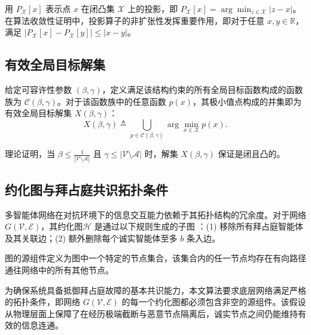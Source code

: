 \documentclass[12pt,hyperref,a4paper,UTF8]{ctexart}
\numberwithin{equation}{section}
\numberwithin{figure}{section}
\numberwithin{table}{section}
\begin{document}
用 $P_{\mathcal{X}}[x]$ 表示点 $x$ 在闭凸集 $\mathcal{X}$ 上的投影，即 $P_{\mathcal{X}}[x] = \arg\min_{z\in\mathcal{X}}|z-x|$。在算法收敛性证明中，投影算子的非扩张性发挥重要作用，即对于任意 $x,y\in\mathbb{R}$，满足 $|P_{\mathcal{X}}[x] - P_{\mathcal{X}}[y]| \le |x-y|$。

\subsection{有效全局目标解集}
\quad \quad 给定可容许性参数 $(\beta,\gamma)$，定义满足该结构约束的所有全局目标函数构成的函数族为 $\mathcal{C}(\beta,\gamma)$。对于该函数族中的任意函数 $p(x)$，其极小值点构成的并集即为有效全局目标解集 $X(\beta,\gamma)$：
\begin{equation}
    X(\beta,\gamma)\triangleq \bigcup_{p\in\mathcal{C}(\beta,\gamma)} \arg\min_{x\in\mathcal{X}} p(x).
    \label{eq:Xdef_app}
\end{equation}

理论证明，当 $\beta\le\frac{1}{|\mathcal{V}\setminus\mathcal{A}|}$ 且 $\gamma\le|\mathcal{V}\setminus\mathcal{A}|$ 时，解集 $X(\beta,\gamma)$ 保证是闭且凸的。

\subsection{约化图与拜占庭共识拓扑条件}
\quad \quad 多智能体网络在对抗环境下的信息交互能力依赖于其拓扑结构的冗余度。对于网络 $G(\mathcal{V},\mathcal{E})$，其约化图$\mathcal{H}$ 是通过以下规则生成的子图 \cite{vaidya2012iterative}：(1) 移除所有拜占庭智能体及其关联边；(2) 额外删除每个诚实智能体至多 $b$ 条入边。

图的源组件定义为图中一个特定的节点集合，该集合内的任一节点均存在有向路径通往网络中的所有其他节点。

为确保系统具备抵御拜占庭故障的基本共识能力，本文算法要求底层网络满足严格的拓扑条件，即网络 $G(\mathcal{V},\mathcal{E})$ 的每一个约化图都必须包含非空的源组件。该假设从物理层面上保障了在经历极端截断与恶意节点隔离后，诚实节点之间仍能维持有效的信息连通。
\end{document}
